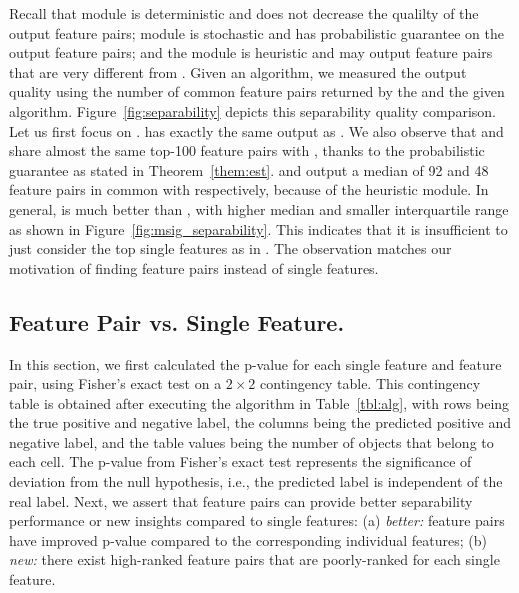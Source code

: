  Recall that \earlyT module is deterministic and does not decrease the qualilty of the output \topk feature pairs; \sampling module is stochastic and has probabilistic guarantee on the output \topk feature pairs; and the \traversal module is heuristic and may output \topk feature pairs that are very different from \baseline. Given an algorithm, we measured the output quality using the number of common feature pairs returned by the \baseline and the given algorithm. Figure~\ref{fig:separability} depicts this separability quality comparison. Let us first focus on \msig. \earlyOrder has exactly the same output as \baseline. We also observe that \samp and \sampOpt share almost the same top-100 feature pairs with \baseline, thanks to the probabilistic guarantee as stated in Theorem~\ref{them:est}. \horiz and \vertic output a median of 92 and 48 feature pairs in common with \baseline respectively, because of the heuristic \traversal module. In general, \horiz is much better than \vertic, with higher median and smaller interquartile range as shown in Figure~\ref{fig:msig_separability}. This indicates that it is insufficient to just consider the top single features as in \vertic. The observation matches our motivation of finding feature pairs instead of single features.

\subsection{Feature Pair vs. Single Feature.}
In this section, we first calculated the p-value for each \topk single feature and feature pair, using Fisher's exact test on a $2\times2$ contingency table. This contingency table is obtained after executing the algorithm in Table~\ref{tbl:alg}, with rows being the true positive and negative label, the columns being the predicted positive and negative label, and the table values being the number of objects that belong to each cell. The p-value from Fisher's exact test represents the significance of deviation from the null hypothesis, i.e., the predicted label is independent of the real label. Next, we assert that feature pairs can provide better separability performance or new insights compared to single features: (a) {\em better:} feature pairs have improved p-value compared to the corresponding individual features; (b) {\em new:} there exist high-ranked feature pairs that are poorly-ranked for each single feature. 

